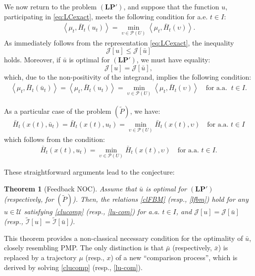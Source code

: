 \documentclass[sn-mathphys-num]{sn-jnl}
\numberwithin{equation}{section}
\theoremstyle{mythm}
\newtheorem{theorem}[proposition]{Theorem}
\theoremstyle{mydef}
\begin{document}
We now return to the problem \( (\bm{LP}') \), and suppose that the function \( u \), participating  in \eqref{eq:LCexact}, meets the following condition for a.e. \( t \in I \):
\begin{align}
    \left\langle \mu_t, \bar{H}_t(u_t) \right\rangle = \min_{\upsilon \in \mathcal{P}(U)} \left< \mu_t, \bar{H}_t(\upsilon) \right>.%
    \label{clucomp}
\end{align}
As immediately follows from the representation \eqref{eq:LCexact}, the inequality \[ \mathcal{J}[u] \leq \mathcal{J}[\bar{u}] \] holds. Moreover, if \( \bar{u} \) is optimal for \( (\bm{LP}') \), we must have equality: 
\[ 
    \mathcal{J}[u] = \mathcal{J}[\bar{u}],
\]
which, due to the non-positivity of the integrand, implies the following condition:
\begin{align}
    \left\langle \mu_t, \bar{H}_t(\bar{u}_t) \right\rangle = \left\langle \mu_t, \bar{H}_t(u_t) \right\rangle = \min_{\upsilon \in \mathcal{P}(U)} \left< \mu_t, \bar{H}_t(\upsilon) \right> \quad \text{for a.a. } \ t \in I. \label{clFBM}
\end{align}

As a particular case of the problem $(\widetilde{P})$, we have:
\begin{align}
    \bar{H}_t(x(t), \bar{u}_t) = \bar{H}_t(x(t), u_t) = \min_{\upsilon \in \mathcal{P}(U)} \bar{H}_t(x(t), \upsilon) \quad \text{for a.a. } t \in I \label{lfbm}
\end{align}
which follows from the condition:
\begin{align}
    \bar{H}_t(x(t), u_t) = \min_{\upsilon \in \mathcal{P}(U)} \bar{H}_t(x(t), \upsilon) \quad \text{for a.a. } t \in I. \label{lu-com}
\end{align}

These straightforward arguments lead to the conjecture:
\begin{theorem}[Feedback NOC]\label{thm:fbc}
    Assume that \( \bar{u} \) is optimal for \( (\bm{LP}') \) {\rm (}respectively, for \( (\widetilde{P}) \){\rm )}. Then, the relations \eqref{clFBM} (resp., \eqref{lfbm}) hold for any \( u \in \mathcal{U} \) satisfying \eqref{clucomp} {\rm (}resp., \eqref{lu-com}\textrm{)} for a.a. \( t \in I \), and \( \mathcal{J}[u] = \mathcal{J}[\bar{u}] \) {\rm (}resp., \( \widetilde{\mathcal{I}}[u] = \widetilde{\mathcal{I}}[\bar{u}] \){\rm )}.
\end{theorem}

This theorem provides a non-classical necessary condition for the optimality of \( \bar{u} \), closely resembling PMP. The only distinction is that \( \bar{\mu} \) (respectively, \( \bar{x} \)) is replaced by a trajectory \( \mu \) (resp., \( x \)) of a new ``comparison process'', which is derived by solving \eqref{clucomp} (resp., \eqref{lu-com}). 
\end{document}
